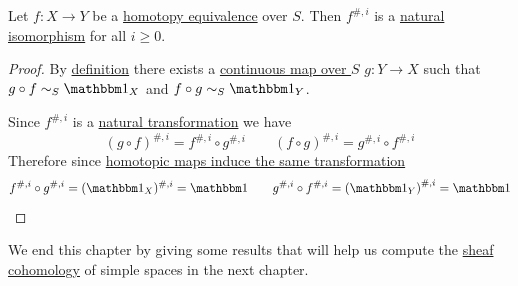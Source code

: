\documentclass[../../main]{subfiles}
\begin{document}
\begin{corollary}\label{cor:cohomology-and-homotopy-equivalence}
  Let \(f\colon X \to Y\) be a \hyperref[def:homotopy-over]{homotopy equivalence} over \(S\).
  Then \(f^{\#, i}\) is a \hyperref[def:natural-transformation]{natural isomorphism} for all \(i \geq 0\).
\end{corollary}
\begin{proof}
  By \hyperref[def:homotopy-over]{definition} there exists a \hyperref[def:continuous-map-over]{continuous map over \(S\)} \(g\colon Y \to X\) such that \(g \circ f \sim_{S} \id_{X}\) and \(f \circ g \sim_{S} \id_{Y}\).

  Since \(f^{\#, i}\) is a \hyperref[def:natural-transformation]{natural transformation} we have
  \begin{equation*}
    \left( g \circ f \right)^{\#, i} = f^{\#, i} \circ g^{\#, i} \qquad \left( f \circ g \right)^{\#, i} = g^{\#, i} \circ f^{\#, i}
  \end{equation*}
  Therefore since \hyperref[thm:homotopy-invariance-cohomology]{homotopic maps induce the same transformation}
  \begin{equation*}
    f^{\#, i} \circ g^{\#, i} = (\id_{X})^{\#, i} = \id \qquad g^{\#, i} \circ f^{\#, i} = \left( \id_{Y} \right)^{\#, i} = \id \qedhere
  \end{equation*}
\end{proof}

We end this chapter by giving some results that will help us compute the \hyperref[def:sheaf-cohomology]{sheaf cohomology} of simple spaces in the next chapter.
\end{document}
